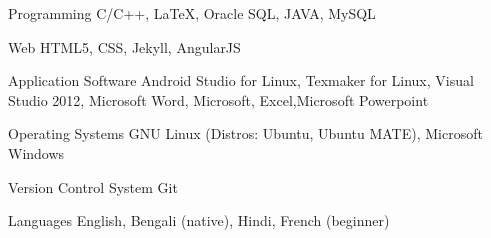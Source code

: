 


\begin{cvskills}


\cvskill
{Programming} %
{C/C++, LaTeX, Oracle SQL, JAVA, MySQL} %


\cvskill
{Web} %
{ HTML5, CSS, Jekyll, AngularJS} %


\cvskill
{Application Software} %
{Android Studio for Linux, Texmaker for Linux, Visual Studio 2012, Microsoft Word, Microsoft, Excel,\newline Microsoft Powerpoint } %


\cvskill
{Operating Systems} %
{GNU Linux (Distros: Ubuntu, Ubuntu MATE), Microsoft Windows} %


\cvskill
{Version Control System} %
{Git} %


\cvskill
{Languages} %
{English, Bengali (native), Hindi, French (beginner)} %


\end{cvskills}